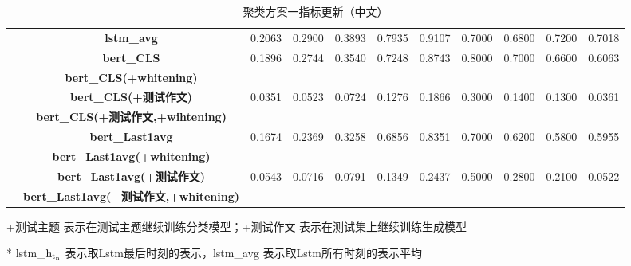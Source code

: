 \documentclass[11pt]{article}
\begin{document}
\begin{CJK}{UTF8}{gkai}
\begin{table}[hp]
{\begin{tabular}{c|c|ccccccccc}
      & \textbf{lstm\_avg} & 0.2063  & 0.2900  & 0.3893  & 0.7935  & 0.9107  & 0.7000  & 0.6800  & 0.7200  & 0.7018  \\
      \cline{2-11}
      & \textbf{bert\_CLS} & 0.1896  & 0.2744  & 0.3540  & 0.7248  & 0.8743  & 0.8000  & 0.7000  & 0.6600  & 0.6063  \\
      & \textbf{bert\_CLS(+whitening)} &       &       &       &       &       &       &       &       &  \\
      & \textbf{bert\_CLS(+测试作文)} & 0.0351  & 0.0523  & 0.0724  & 0.1276  & 0.1866  & 0.3000  & 0.1400  & 0.1300  & 0.0361  \\
      & \textbf{bert\_CLS(+测试作文,+wihtening)} &       &       &       &       &       &       &       &       &  \\
      \cline{2-11}
      & \textbf{bert\_Last1avg} & 0.1674  & 0.2369  & 0.3258  & 0.6856  & 0.8351  & 0.7000  & 0.6200  & 0.5800  & 0.5955  \\
      & \textbf{bert\_Last1avg(+whitening)} &       &       &       &       &       &       &       &       &  \\
      & \textbf{bert\_Last1avg(+测试作文)} & 0.0543  & 0.0716  & 0.0791  & 0.1349  & 0.2437  & 0.5000  & 0.2800  & 0.2100  & 0.0522  \\
      & \textbf{bert\_Last1avg(+测试作文,+whitening)} &       &       &       &       &       &       &       &       &  \\
      \hline
    \end{tabular}}%
    \begin{tablenotes}    %
      \footnotesize               %
      \item[2] +测试主题 表示在测试主题继续训练分类模型；+测试作文 表示在测试集上继续训练生成模型
      \item[5] * lstm\_$\rm h_{t_n}$ 表示取Lstm最后时刻的表示，lstm\_avg 表示取Lstm所有时刻的表示平均 
    \end{tablenotes} 
    \caption{聚类方案一指标更新（中文）}
  \label{tab:addlabel}%
\end{table}%


\end{CJK}
\end{document}
